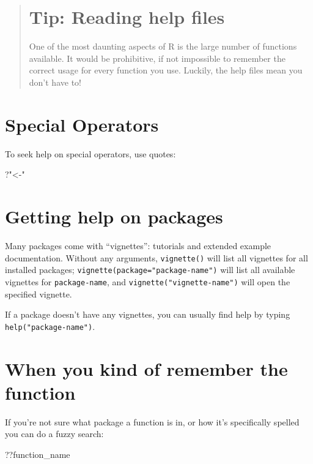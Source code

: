 \documentclass[]{book}
\newenvironment{Shaded}{\begin{snugshade}}{\end{snugshade}}
\newcommand{\StringTok}[1]{\textcolor[rgb]{0.31,0.60,0.02}{#1}}
\newcommand{\NormalTok}[1]{#1}
\begin{document}
\begin{quote}
\section{Tip: Reading help files}\label{tip-reading-help-files}

One of the most daunting aspects of R is the large number of functions
available. It would be prohibitive, if not impossible to remember the
correct usage for every function you use. Luckily, the help files mean
you don't have to!
\end{quote}

\section{Special Operators}\label{special-operators}

To seek help on special operators, use quotes:

\begin{Shaded}
\begin{Highlighting}[]
\NormalTok{?}\StringTok{"<-"}
\end{Highlighting}
\end{Shaded}

\section{Getting help on packages}\label{getting-help-on-packages}

Many packages come with ``vignettes'': tutorials and extended example
documentation. Without any arguments, \texttt{vignette()} will list all
vignettes for all installed packages;
\texttt{vignette(package="package-name")} will list all available
vignettes for \texttt{package-name}, and
\texttt{vignette("vignette-name")} will open the specified vignette.

If a package doesn't have any vignettes, you can usually find help by
typing \texttt{help("package-name")}.

\section{When you kind of remember the
function}\label{when-you-kind-of-remember-the-function}

If you're not sure what package a function is in, or how it's
specifically spelled you can do a fuzzy search:

\begin{Shaded}
\begin{Highlighting}[]
\NormalTok{??function_name}
\end{Highlighting}
\end{Shaded}
\end{document}
